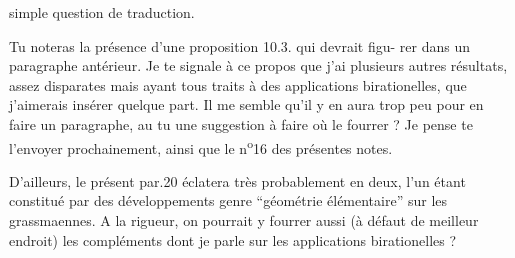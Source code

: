 
simple question de traduction.

Tu noteras la présence d'une proposition 10.3. qui devrait figu-%
rer dans un paragraphe antérieur. Je te signale à ce propos que j'ai
plusieurs autres résultats, assez disparates mais ayant tous traits à
des applications birationelles, que j'aimerais insérer quelque part.
Il me semble qu'il y en aura trop peu pour en faire un paragraphe, au
tu une suggestion à faire où le fourrer ? Je pense te l'envoyer
prochainement, ainsi que le n\textsuperscript{o}16 des présentes notes.

D'ailleurs, le présent par.20 éclatera très probablement en
deux, l'un étant constitué par des développements genre ``géométrie
élémentaire'' sur les grassmaennes. A la rigueur, on pourrait y fourrer
aussi (à défaut de meilleur endroit) les compléments dont je parle sur
les applications birationelles ?

